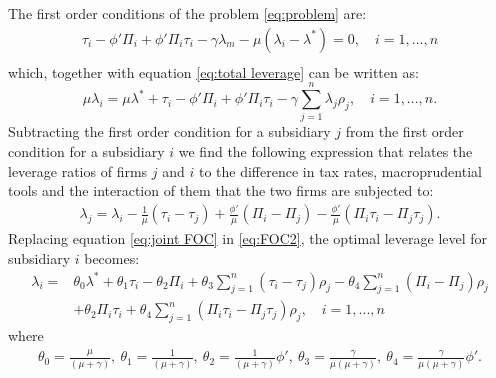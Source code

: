 \documentclass[12pt]{article}
\begin{document}
	The first order conditions of the problem \ref{eq:problem} are:
	\begin{equation}
	\begin{aligned}
	\tau_i-\phi'\Pi_i+\phi'\Pi_i\tau_{i}-\gamma\lambda_m-\mu(\lambda_i-\lambda^*)=0, \quad i=1,...,n\\
	\end{aligned}
	\label{eq:FOC}
	\end{equation}
	which, together with equation \ref{eq:total leverage} can be written as:  
	\begin{equation}
	\mu\lambda_i=\mu\lambda^*+\tau_{i}-\phi'\Pi_i+\phi'\Pi_i\tau_{i}-\gamma \sum_{j=1}^{n}\lambda_j\rho_j, \quad i=1,...,n.
	\label{eq:FOC2}
	\end{equation}
	Subtracting the first order condition for a subsidiary $j$ from the first order condition for a subsidiary $i$ we find the following expression that relates the leverage ratios of firms $j$ and $i$ to the difference in tax rates, macroprudential tools and the interaction of them that the two firms are subjected to:
	\begin{equation}
	\begin{aligned}
	\lambda_j=\lambda_i-\frac{1}{\mu}(\tau_i-\tau_j)+\frac{\phi'}{\mu}(\Pi_i-\Pi_j)-\frac{\phi'}{\mu}(\Pi_i\tau_i-\Pi_j\tau_j).
	\end{aligned}
	\label{eq:joint FOC}
	\end{equation}
	Replacing equation \ref{eq:joint FOC} in \ref{eq:FOC2}, the optimal leverage level for subsidiary $i$ becomes:  
	\begin{equation}
	\begin{aligned}
	\lambda_i=&\theta_0\lambda^*+\theta_1\tau_i-\theta_2\Pi_i+\theta_3\sum_{j=1}^{n}(\tau_i-\tau_j)\rho_j-\theta_4\sum_{j=1}^{n}(\Pi_i-\Pi_j)\rho_j\\
	&+\theta_2\Pi_i\tau_{i}+\theta_4\sum_{j=1}^{n}(\Pi_i\tau_i-\Pi_j\tau_j)\rho_j, \quad i=1,...,n
	\end{aligned}
	\label{eq:optimal leverage in theory}
	\end{equation}
	where
	\begin{equation*}
	\begin{aligned}
	 \theta_0=\frac{\mu}{(\mu+\gamma)}, \ \theta_1=\frac{1}{(\mu+\gamma)}, \
	\theta_2=\frac{1}{(\mu+\gamma)}\phi', \
	\theta_3=\frac{\gamma}{\mu(\mu+\gamma)}, \
	\theta_4=\frac{\gamma}{\mu(\mu+\gamma)}\phi'.
	\end{aligned}
	\end{equation*}
	
\end{document}
